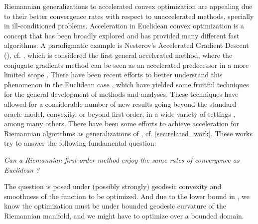 \documentclass[12pt]{alt2021}
\begin{document}
Riemannian generalizations to accelerated convex optimization are appealing due to their better convergence rates with respect to unaccelerated methods, specially in ill-conditioned problems. Acceleration in Euclidean convex optimization is a concept that has been broadly explored and has provided many different fast algorithms. A paradigmatic example is Nesterov's Accelerated Gradient Descent (), cf. \citep{nesterov1983method}, which is considered the first general accelerated method, where the conjugate gradients method can be seen as an accelerated predecessor in a more limited scope \citep{martinez2021acceleration}. There have been recent efforts to better understand this phenomenon in the Euclidean case \citep{allen2014linear,su2014differential,drori2014performance,wibisono2016variational, diakonikolas2017approximate,joulani2020simpler}, which have yielded some fruitful techniques for the general development of methods and analyses. These techniques have allowed for a considerable number of new results going beyond the standard oracle model, convexity, or beyond first-order, in a wide variety of settings \citep{tseng2008accelerated, beck2009fista,wang2015unified,DBLP:conf/stoc/ZhuO15,allen2016katyusha, allen2017natasha, carmon2017convex, diakonikolas2017accelerated, hinder2019near, DBLP:conf/colt/GasnikovDGVSU0W19, ivanova2021adaptive, kamzolov2020near, criado2021fast}, among many others. There have been some efforts to achieve acceleration for Riemannian algorithms as generalizations of \AGD{}, cf. \cref{sec:related_work}. These works try to answer the following fundamental question:

\begin{center}
\textit{Can a Riemannian first-order method enjoy the same rates of convergence as Euclidean \AGD{}?}
\end{center}

The question is posed under (possibly strongly) geodesic convexity and smoothness of the function to be optimized. And due to the lower bound in \citep{criscitiello2022negative}, we know the optimization must be under bounded geodesic curvature of the Riemannian manifold, and we might have to optimize over a bounded domain.
\end{document}
